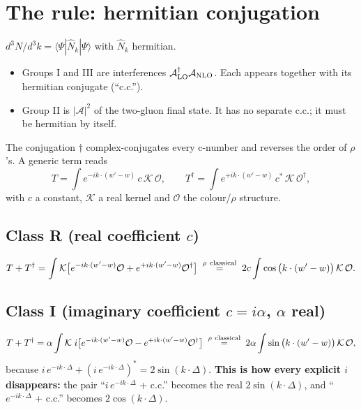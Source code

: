 \documentclass[10pt]{article}
\numberwithin{equation}{section}
\begin{document}
\section{The rule: hermitian conjugation}
$d^3N/d^3k=\langle\Psi|\hat N_k|\Psi\rangle$ with $\hat N_k$ hermitian.
\begin{itemize}
\item Groups I and III are interferences $\mathcal A_{\rm LO}^\dagger\mathcal A_{\rm NLO}$. Each appears together with its hermitian conjugate (``c.c.'').
\item Group II is $|\mathcal A|^2$ of the two-gluon final state. It has no separate c.c.; it must be hermitian by itself.
\end{itemize}
The conjugation $\dagger$ complex-conjugates every c-number and reverses the order of $\rho$'s. A generic term reads
\begin{equation}
T=\int e^{-ik\cdot(w'-w)}\,c\,\mathcal K\,\mathcal O,\qquad T^\dagger=\int e^{+ik\cdot(w'-w)}\,c^*\,\mathcal K\,\mathcal O^\dagger,
\end{equation}
with $c$ a constant, $\mathcal K$ a real kernel and $\mathcal O$ the colour/$\rho$ structure.

\subsection{Class R (real coefficient $c$)}
\begin{equation}
T+T^\dagger=\int\mathcal K\big[e^{-ik\cdot(w'-w)}\mathcal O+e^{+ik\cdot(w'-w)}\mathcal O^\dagger\big]
\;\overset{\rho\ \rm classical}{=}\;2c\int\cos\big(k\cdot(w'-w)\big)\,\mathcal K\,\mathcal O .
\end{equation}

\subsection{Class I (imaginary coefficient $c=i\alpha$, $\alpha$ real)}
\begin{equation}
T+T^\dagger=\alpha\int\mathcal K\;i\big[e^{-ik\cdot(w'-w)}\mathcal O-e^{+ik\cdot(w'-w)}\mathcal O^\dagger\big]
\;\overset{\rho\ \rm classical}{=}\;2\alpha\int\sin\big(k\cdot(w'-w)\big)\,\mathcal K\,\mathcal O ,
\end{equation}
because $i\,e^{-ik\cdot\Delta}+(i\,e^{-ik\cdot\Delta})^*=2\sin(k\cdot\Delta)$.
\textbf{This is how every explicit $i$ disappears:} the pair ``$i\,e^{-ik\cdot\Delta}$ + c.c.'' becomes the real $2\sin(k\cdot\Delta)$, and ``$e^{-ik\cdot\Delta}$ + c.c.'' becomes $2\cos(k\cdot\Delta)$.
\end{document}
